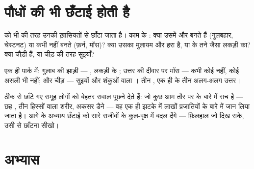 \section{पौधों की भी छँटाई होती है}

\begin{proposition}[पौधों की छँटाई]\label{prop:g3:sorting-living-things:plants}
 को भी  की तरह उनकी ख़ासियतों से छाँटा जाता है। काम के
: क्या उसमें \emph{} और  बनते हैं (गुलबहार, चेस्टनट) या
कभी नहीं बनते (फ़र्न, मॉस)? क्या उसका  मुलायम और हरा है, या
\emph{} के तने जैसा लकड़ी का? क्या  चौड़ी हैं, या चीड़ की
तरह सुइयाँ?
\end{proposition}
\admitted

\begin{example}[पार्क के तीन कोने]\label{ex:g3:sorting-living-things:park}
एक ही पार्क में: गुलाब की झाड़ी --- , लकड़ी के ; उत्तर की दीवार
पर मॉस --- कभी कोई  नहीं, कोई असली  भी नहीं; और चीड़ --- सुइयों
और शंकुओं वाला । तीन , एक ही  के तीन अलग-अलग उत्तर।
\end{example}

\begin{remark}[छँटाई विज्ञान का पहला क़दम है]\label{rem:g3:sorting-living-things:science}
ठीक से छाँटे गए समूह लोगों को बेहतर सवाल पूछने देते हैं: जो कुछ आम तौर
पर  के बारे में सच है --- छह , तीन हिस्सों वाला शरीर, अकसर
डैने --- वह एक ही झटके में लाखों प्रजातियों के बारे में जान लिया जाता
है। आगे के अध्याय छँटाई को सारे सजीवों के कुल-वृक्ष में बदल देंगे ---
फ़िलहाल जो दिख सके, उसी से छाँटना सीखो।
\end{remark}

\section{अभ्यास}

